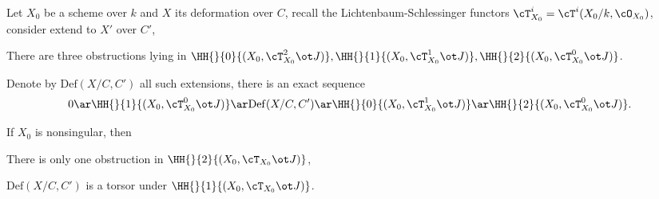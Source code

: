 \documentclass[article, a4paper, twoside]{universal}
\begin{document}
\begin{thm}
	Let $X_{0}$ be a scheme over $k$ and $X$ its deformation over $C$, recall the Lichtenbaum-Schlessinger functors $\cT_{X_{0}}^{i}=\cT^{i}(X_{0}/k,\cO_{X_{0}})$, consider extend to $X'$ over $C'$,
	\begin{itm}
		\item There are three obstructions lying in $\HH{}{0}{(X_{0},\cT_{X_{0}}^{2}\ot J)},\HH{}{1}{(X_{0},\cT_{X_{0}}^{1}\ot J)},\HH{}{2}{(X_{0},\cT_{X_{0}}^{0}\ot J)}$.
		\item Denote by $\mathrm{Def}(X/C,C')$ all such extensions, there is an exact sequence
		\[
			0\ar\HH{}{1}{(X_{0},\cT_{X_{0}}^{0}\ot J)}\ar \mathrm{Def}(X/C,C')\ar \HH{}{0}{(X_{0},\cT_{X_{0}}^{1}\ot J)}\ar\HH{}{2}{(X_{0},\cT_{X_{0}}^{0}\ot J)}.
		\]
	\end{itm}

	If $X_{0}$ is nonsingular, then
	\begin{itm}
		\item There is only one obstruction in $\HH{}{2}{(X_{0},\cT_{X_{0}}\ot J)}$,
		\item $\mathrm{Def}(X/C,C')$ is a torsor under $\HH{}{1}{(X_{0},\cT_{X_{0}}\ot J)}$.
	\end{itm}
\end{thm}


\printref
\end{document}
